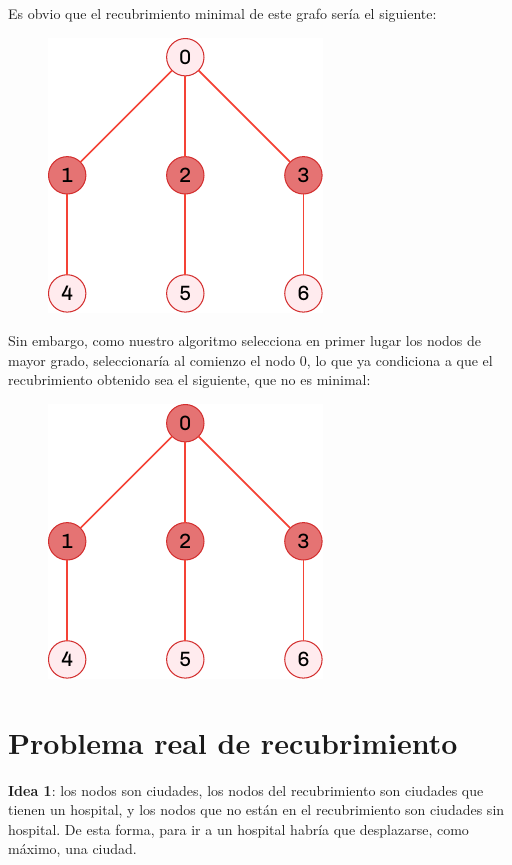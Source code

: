\documentclass[11pt]{article}
\begin{document}
Es obvio que el recubrimiento minimal de este grafo sería el siguiente:

\begin{figure}[H]
	\centering \includegraphics{./img/grafo2-minimal.pdf}
\end{figure}

Sin embargo, como nuestro algoritmo selecciona en primer lugar los nodos de mayor grado, seleccionaría al comienzo el nodo $0$, lo que ya condiciona a que el recubrimiento obtenido sea el siguiente, que no es minimal:

\begin{figure}[H]
	\centering \includegraphics{./img/grafo2-no-minimal.pdf}
\end{figure}

\section*{Problema real de recubrimiento}

\textbf{Idea 1}: los nodos son ciudades, los nodos del recubrimiento son ciudades que tienen un hospital, y los nodos que no están en el recubrimiento son ciudades sin hospital. De esta forma, para ir a un hospital habría que desplazarse, como máximo, una ciudad.
\end{document}
